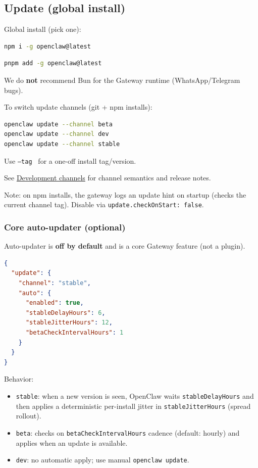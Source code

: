 \subsection{Update (global install)}


Global install (pick one):

\begin{lstlisting}[language=bash]
npm i -g openclaw@latest
\end{lstlisting}


\begin{lstlisting}[language=bash]
pnpm add -g openclaw@latest
\end{lstlisting}


We do \textbf{not} recommend Bun for the Gateway runtime (WhatsApp/Telegram bugs).

To switch update channels (git + npm installs):

\begin{lstlisting}[language=bash]
openclaw update --channel beta
openclaw update --channel dev
openclaw update --channel stable
\end{lstlisting}


Use \texttt{--tag } for a one-off install tag/version.

See \href{/install/development-channels}{Development channels} for channel semantics and release notes.

Note: on npm installs, the gateway logs an update hint on startup (checks the current channel tag). Disable via \texttt{update.checkOnStart: false}.

\subsubsection{Core auto-updater (optional)}


Auto-updater is \textbf{off by default} and is a core Gateway feature (not a plugin).

\begin{lstlisting}[language=json]
{
  "update": {
    "channel": "stable",
    "auto": {
      "enabled": true,
      "stableDelayHours": 6,
      "stableJitterHours": 12,
      "betaCheckIntervalHours": 1
    }
  }
}
\end{lstlisting}


Behavior:

\begin{itemize}
  \item \texttt{stable}: when a new version is seen, OpenClaw waits \texttt{stableDelayHours} and then applies a deterministic per-install jitter in \texttt{stableJitterHours} (spread rollout).
  \item \texttt{beta}: checks on \texttt{betaCheckIntervalHours} cadence (default: hourly) and applies when an update is available.
  \item \texttt{dev}: no automatic apply; use manual \texttt{openclaw update}.
\end{itemize}


